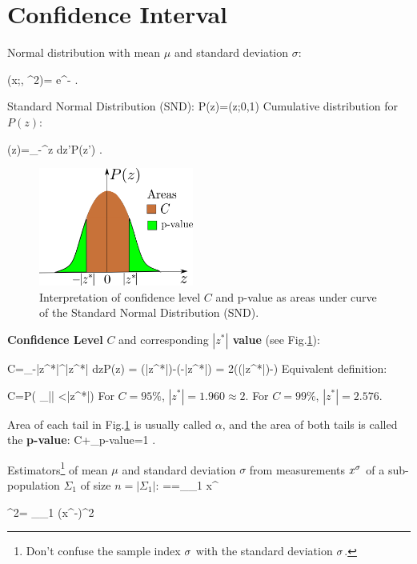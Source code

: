 \section{Confidence Interval}

Normal distribution
with mean $\mu$
and standard deviation $\sigma$:

\beq
\caln(x;\mu, \s^2)=
e^{-\;}
\;.
\eeq

Standard Normal Distribution (SND):
\beq
P(z)=\caln(z;0,1)
\eeq
Cumulative distribution for $P(z)$:

\beq
\Phi(z)=\int_{-\infty}^z dz'\;P(z')
\;.
\eeq

\begin{figure}[h!]
\centering
\includegraphics[width=2in]
{conventions/conf-int.png}
\caption{
Interpretation
of confidence level $C$
and p-value as areas under curve of the
Standard Normal Distribution (SND).}
\label{fig-conf-int}
\end{figure}

{\bf Confidence Level} $C$
and corresponding {\bf $|z^*|$ value}
(see Fig.\ref{fig-conf-int}):

\beq
C=\int_{-|z^*|}^{|z^*|} dz\;P(z) =
\Phi(|z^*|)-\Phi(-|z^*|)
=
2\left(\Phi(|z^*|)-\;\right)
\label{eq-conf-level1}
\eeq
Equivalent definition:

\beq
C=P\left(
_{|\rvz|}
<|z^*|\right)
\label{eq-conf-level2}
\eeq
For $C=95\%$,
$|z^*|=1.960\approx 2$.
For $C=99\%$, $|z^*|=2.576$.

Area of each tail
in Fig.\ref{fig-conf-int} is
usually called $\alpha$,
and the area of both tails is called
the {\bf p-value}:
\beq
C+\underbrace{2\alpha}_{p-value}=1
\;.
\eeq

Estimators\footnote{Don't
confuse the sample index $\sigma$
with the standard deviation $\sigma$.} of
mean $\mu$  and
standard deviation $\sigma$
from measurements $x^\sigma$
of a sub-population $\Sigma_1$ of
size $n=|\Sigma_1|$:
\beq
\HAT{\mu}==\sum_{\s \in\Sigma_1} x^\s
\eeq

\beq
\HAT{\s}^2=
\sum_{\s\in \Sigma_1} (x^\s-)^2
\eeq


